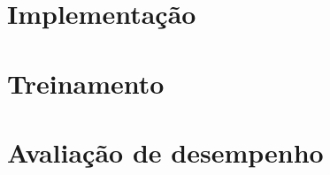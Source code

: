 
\section{Implementação}


\section{Treinamento}

\section{Avaliação de desempenho}\label{sec:desemp}

